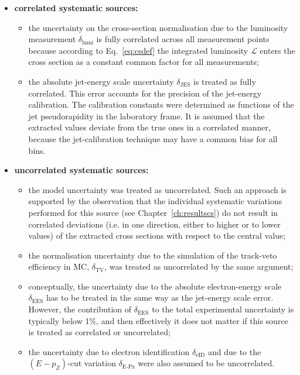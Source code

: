 \begin{itemize}
 \item \textbf{correlated systematic sources:}
 \begin{itemize}
 \item the uncertainty on the cross-section normalisation due to the luminosity measurement $\delta_\text{lumi}$ is fully correlated across all measurement points because according to Eq.~\eqref{eq:csdef} the integrated luminosity $\mathcal{L}$ enters the cross section as a constant common factor for all measurements;
 \item the absolute jet-energy scale uncertainty $\delta_\text{JES}$ is treated as fully correlated. This error accounts for the precision of the jet-energy calibration. The calibration constants were determined as functions of the jet pseudorapidity in the laboratory frame. It is assumed that the extracted values deviate from the true ones in a correlated manner, because the jet-calibration technique may have a common bias for all bins.
 \end{itemize}
 \item \textbf{uncorrelated systematic sources:}
 \begin{itemize}
 \item the model uncertainty was treated as uncorrelated. Such an approach is supported by the observation that the individual systematic variations performed for this source (see Chapter~\ref{ch:resultscs}) do not result in correlated deviations (i.e. in one direction, either to higher or to lower values) of the extracted cross sections with respect to the central value;
 \item the normalisation uncertainty due to the simulation of the track-veto efficiency in MC, $\delta_\text{TV}$, was treated as uncorrelated by the same argument;
 \item conceptually, the uncertainty due to the absolute electron-energy scale $\delta_\text{EES}$ has to be treated in the same way as the jet-energy scale error. However, the contribution of $\delta_\text{EES}$ to the total experimental uncertainty is typically below 1\%, and then effectively it does not matter if this source is treated as correlated or uncorrelated;
 \item the uncertainty due to electron identification $\delta_\text{eID}$ and due to the $\left(E-p_Z\right)$-cut variation $\delta_\text{E-Pz}$ were also assumed to be uncorrelated.
 \end{itemize}
\end{itemize}
